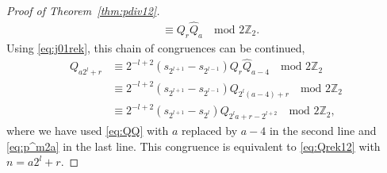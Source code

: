 \documentclass[12pt,reqno]{amsart}
\numberwithin{equation}{section}
\theoremstyle{remark}
\begin{document}
\begin{proof}[Proof of Theorem~{\em \ref{thm:pdiv12}}]
\begin{align}
&\equiv Q_r\widehat Q_a\quad \text{mod $2{\mathbb{Z}}_2$}.
\label{eq:QQ}
\end{align}
Using \eqref{eq:j01rek}, this chain of congruences can be continued,
\begin{align*}
Q_{a2^l+r}&\equiv 2^{-l+2}(s_{2^{l+1}}-s_{2^{l-1}})
Q_r\widehat Q_{a-4}\quad \text{mod $2{\mathbb{Z}}_2$}\\
&\equiv 2^{-l+2}(s_{2^{l+1}}-s_{2^{l-1}})
Q_{2^l(a-4)+r}\quad \text{mod $2{\mathbb{Z}}_2$}\\
&\equiv 2^{-l+2}(s_{2^{l+1}}-s_{2^{l}})
Q_{2^la+r-2^{l+2}}\quad \text{mod $2{\mathbb{Z}}_2$},
\end{align*}
where we have used \eqref{eq:QQ} with $a$ replaced by $a-4$ in the second
line and \eqref{eq:p^m2a} in the last line.
This congruence is equivalent to \eqref{eq:Qrek12} with $n=a2^l+r$.


\end{proof}
\end{document}
